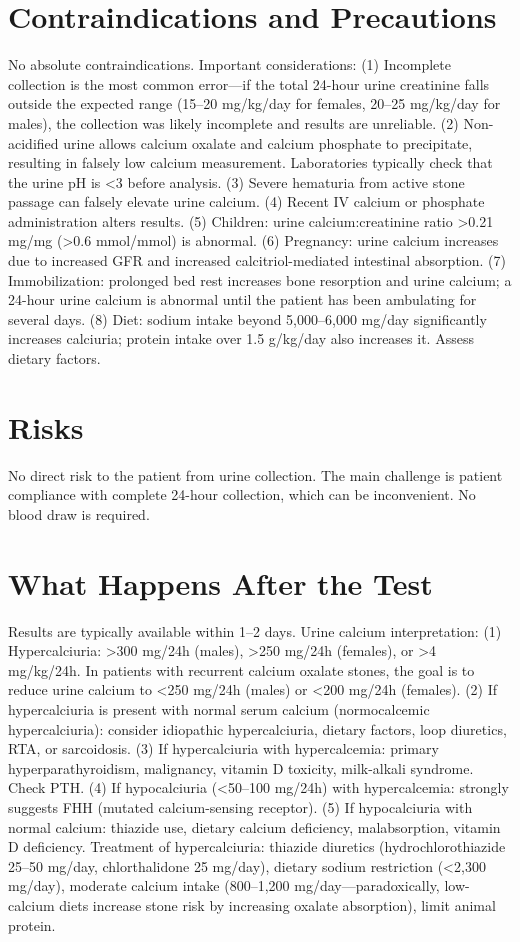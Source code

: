 \section*{Contraindications and Precautions}
No absolute contraindications. Important considerations: (1) Incomplete collection is the most common error---if the total 24-hour urine creatinine falls outside the expected range (15--20 mg/kg/day for females, 20--25 mg/kg/day for males), the collection was likely incomplete and results are unreliable. (2) Non-acidified urine allows calcium oxalate and calcium phosphate to precipitate, resulting in falsely low calcium measurement. Laboratories typically check that the urine pH is <3 before analysis. (3) Severe hematuria from active stone passage can falsely elevate urine calcium. (4) Recent IV calcium or phosphate administration alters results. (5) Children: urine calcium:creatinine ratio >0.21 mg/mg (>0.6 mmol/mmol) is abnormal. (6) Pregnancy: urine calcium increases due to increased GFR and increased calcitriol-mediated intestinal absorption. (7) Immobilization: prolonged bed rest increases bone resorption and urine calcium; a 24-hour urine calcium is abnormal until the patient has been ambulating for several days. (8) Diet: sodium intake beyond 5,000--6,000 mg/day significantly increases calciuria; protein intake over 1.5 g/kg/day also increases it. Assess dietary factors.

\section*{Risks}
No direct risk to the patient from urine collection. The main challenge is patient compliance with complete 24-hour collection, which can be inconvenient. No blood draw is required.

\section*{What Happens After the Test}
Results are typically available within 1--2 days. Urine calcium interpretation: (1) Hypercalciuria: >300 mg/24h (males), >250 mg/24h (females), or >4 mg/kg/24h. In patients with recurrent calcium oxalate stones, the goal is to reduce urine calcium to <250 mg/24h (males) or <200 mg/24h (females). (2) If hypercalciuria is present with normal serum calcium (normocalcemic hypercalciuria): consider idiopathic hypercalciuria, dietary factors, loop diuretics, RTA, or sarcoidosis. (3) If hypercalciuria with hypercalcemia: primary hyperparathyroidism, malignancy, vitamin D toxicity, milk-alkali syndrome. Check PTH. (4) If hypocalciuria (<50--100 mg/24h) with hypercalcemia: strongly suggests FHH (mutated calcium-sensing receptor). (5) If hypocalciuria with normal calcium: thiazide use, dietary calcium deficiency, malabsorption, vitamin D deficiency. Treatment of hypercalciuria: thiazide diuretics (hydrochlorothiazide 25--50 mg/day, chlorthalidone 25 mg/day), dietary sodium restriction (<2,300 mg/day), moderate calcium intake (800--1,200 mg/day---paradoxically, low-calcium diets increase stone risk by increasing oxalate absorption), limit animal protein.

